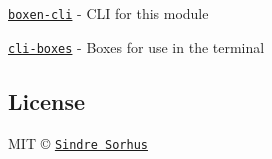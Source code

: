 \begin{DoxyItemize}
\item \href{https://github.com/sindresorhus/boxen-cli}{\tt boxen-\/cli} -\/ C\+LI for this module
\item \href{https://github.com/sindresorhus/cli-boxes}{\tt cli-\/boxes} -\/ Boxes for use in the terminal
\end{DoxyItemize}

\subsection*{License}

M\+IT © \href{http://sindresorhus.com}{\tt Sindre Sorhus} 